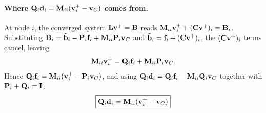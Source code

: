 \begin{derivation}
\paragraph{Where $\mathbf{Q}_i\mathbf{d}_i = \mathbf{M}_{ii}(\mathbf{v}_i^+-\mathbf{v}_C)$ comes from.}
At node $i$, the converged system $\mathbf{L}\mathbf{v}^+=\mathbf{B}$ reads $\mathbf{M}_{ii}\mathbf{v}_i^+ + (\mathbf{C}\mathbf{v}^+)_i = \mathbf{B}_i$. Substituting
$\mathbf{B}_i = \tilde{\mathbf{b}}_i - \mathbf{P}_i\mathbf{f}_i + \mathbf{M}_{ii}\mathbf{P}_i\mathbf{v}_C$ and $\tilde{\mathbf{b}}_i = \mathbf{f}_i + (\mathbf{C}\mathbf{v}^+)_i$, the
$(\mathbf{C}\mathbf{v}^+)_i$ terms cancel, leaving
$$
\mathbf{M}_{ii}\mathbf{v}_i^+ = \mathbf{Q}_i\mathbf{f}_i + \mathbf{M}_{ii}\mathbf{P}_i\mathbf{v}_C.
$$
Hence $\mathbf{Q}_i\mathbf{f}_i = \mathbf{M}_{ii}(\mathbf{v}_i^+-\mathbf{P}_i\mathbf{v}_C)$, and using $\mathbf{Q}_i\mathbf{d}_i=\mathbf{Q}_i\mathbf{f}_i-\mathbf{M}_{ii}\mathbf{Q}_i\mathbf{v}_C$ together with $\mathbf{P}_i+\mathbf{Q}_i=\mathbf{I}$:
\begin{equation}
    \boxed{\mathbf{Q}_i\mathbf{d}_i = \mathbf{M}_{ii}(\mathbf{v}_i^+-\mathbf{v}_C)}
\end{equation}
\end{derivation}

